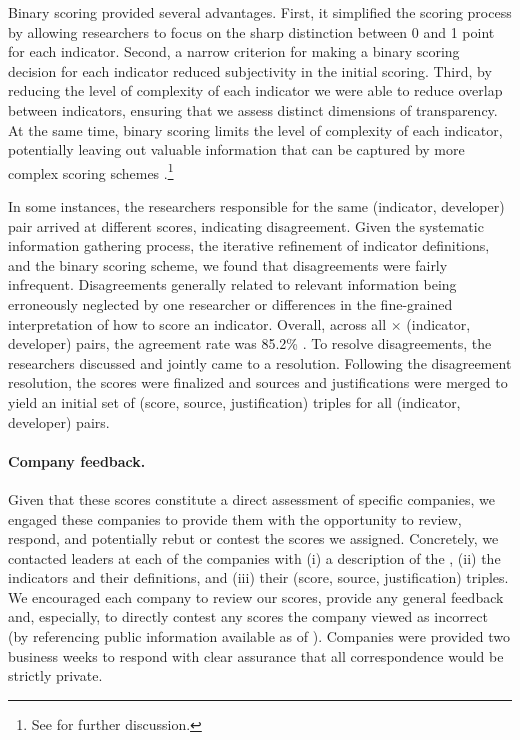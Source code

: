 Binary scoring provided several advantages. First, it simplified the scoring process by allowing researchers to focus on the sharp distinction between 0 and 1 point for each indicator. 
Second, a narrow criterion for making a binary scoring decision for each indicator reduced subjectivity in the initial scoring. 
Third, by reducing the level of complexity of each indicator we were able to reduce overlap between indicators, ensuring that we assess distinct dimensions of transparency.
At the same time, binary scoring limits the level of complexity of each indicator, potentially leaving out valuable information that can be captured by more complex scoring schemes \citep[\cf][]{bommasani2023eu-ai-act}.\footnote{See  for further discussion.}

In some instances, the researchers responsible for the same (indicator, developer) pair arrived at different scores, indicating disagreement. 
Given the systematic information gathering process, the iterative refinement of indicator definitions, and the binary scoring scheme, we found that disagreements were fairly infrequent.
Disagreements generally related to relevant information being erroneously neglected by one researcher or differences in the fine-grained interpretation of how to score an indicator.
Overall, across all \numindicators $\times$ \numcompanies (indicator, developer) pairs, the agreement rate was 85.2\% \citep[Cohen's $\kappa = 0.67$, indicating substantial agreement;][]{landis1977agreement}. 
To resolve disagreements, the researchers discussed and jointly came to a resolution.
Following the disagreement resolution, the scores were finalized and sources and justifications were merged to yield an initial set of \numcells (score, source, justification) triples for all \numcells (indicator, developer) pairs. \clearpage

\paragraph{Company feedback.}
Given that these scores constitute a direct assessment of specific companies, we engaged these companies to provide them with the opportunity to review, respond, and potentially rebut or contest the scores we assigned. 
Concretely, we contacted leaders at each of the companies with (i) a description of the \projectname, 
(ii) the \numindicators indicators and their definitions, and (iii) their \numindicators (score, source, justification) triples. 
We encouraged each company to review our scores, provide any general feedback and, especially, to directly contest any scores the company viewed as incorrect (by referencing public information available as of \informationfreezedate).
Companies were provided two business weeks to respond with clear assurance that all correspondence would be strictly private. 

